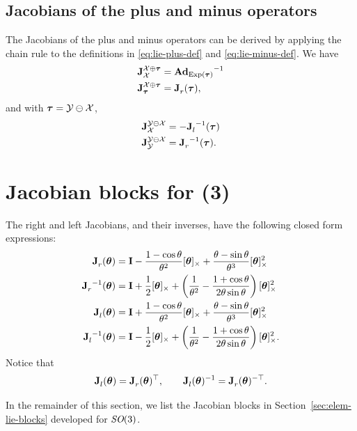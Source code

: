 \subsection{Jacobians of the plus and minus operators}
The Jacobians of the plus and minus operators can be derived by applying the chain rule to the definitions in \eqref{eq:lie-plus-def} and \eqref{eq:lie-minus-def}.
We have
\begin{align}
  \jac{\cX \oplus \vectau}{\cX} &= {\mAd_{\Exp(\vectau)}}^{-1}\\
  \jac{\cX \oplus \vectau}{\vectau} &= \jac{}{r}(\vectau),
\end{align}
and with $\vectau = \cY \ominus \cX$,
\begin{align}
  \jac{\cY \ominus \cX}{\cX} &= -\jac{}{l}^{-1}(\vectau)\\
  \jac{\cY \ominus \cX}{\cY} &= \jac{}{r}^{-1}(\vectau).
\end{align}

\section{Jacobian blocks for \SO(3)} \label{sec:Jacobians-SO3}
The right and left Jacobians, and their inverses, have the following closed form expressions: 
\begin{align}
\jac{}{r}(\vectheta) &= \matI - \frac{1-\cos\theta}{\theta^2}\skewsymm{\vectheta} + \frac{\theta-\sin\theta}{\theta^3}\skewsymm{\vectheta}^2\\
\jac{}{r}^{-1}(\vectheta) &= \matI + \frac{1}{2}\skewsymm{\vectheta} + \left(\frac{1}{\theta^2} - \frac{1+\cos\theta}{2\theta\sin\theta}\right)\skewsymm{\vectheta}^2 \\
\jac{}{l}(\vectheta) &= \matI + \frac{1-\cos\theta}{\theta^2}\skewsymm{\vectheta} + \frac{\theta-\sin\theta}{\theta^3}\skewsymm{\vectheta}^2 \label{eq:SO3-left-jac}\\
\jac{}{l}^{-1}(\vectheta) &= \matI - \frac{1}{2}\skewsymm{\vectheta} + \left(\frac{1}{\theta^2} - \frac{1+\cos\theta}{2\theta\sin\theta}\right)\skewsymm{\vectheta}^2.
\end{align}
Notice that
\begin{equation}
  \jac{}{l}(\vectheta) = \jac{}{r}(\vectheta)\trans, \quad\quad \jac{}{l}(\vectheta)^{-1} = \jac{}{r}(\vectheta)\invtrans.
\end{equation}

In the remainder of this section, we list the Jacobian blocks in Section~\ref{sec:elem-lie-blocks} developed for $\SO(3)$.

